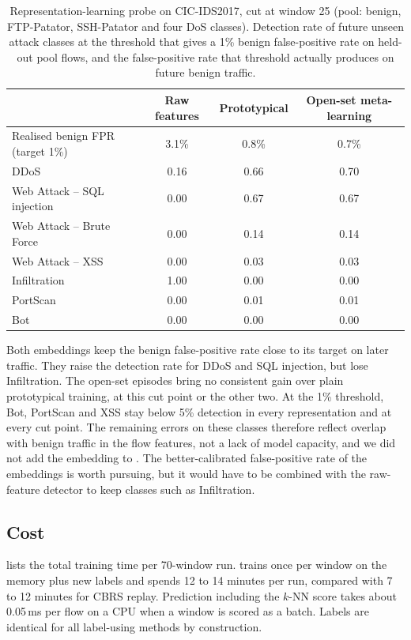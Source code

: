 \begin{table}[t]
\centering
\caption{Representation-learning probe on CIC-IDS2017, cut at window 25 (pool: benign, FTP-Patator, SSH-Patator
and four DoS classes). Detection rate of future unseen attack classes at the threshold that gives a 1\% benign
false-positive rate on held-out pool flows, and the false-positive rate that threshold actually produces on
future benign traffic.}
\label{tab:meta}
\small
\begin{tabular}{@{}lccc@{}}
\toprule
 & Raw features & Prototypical & Open-set meta-learning \\
\midrule
Realised benign FPR (target 1\%) & 3.1\% & 0.8\% & 0.7\% \\
\midrule
DDoS & 0.16 & 0.66 & 0.70 \\
Web Attack -- SQL injection & 0.00 & 0.67 & 0.67 \\
Web Attack -- Brute Force & 0.00 & 0.14 & 0.14 \\
Web Attack -- XSS & 0.00 & 0.03 & 0.03 \\
Infiltration & 1.00 & 0.00 & 0.00 \\
PortScan & 0.00 & 0.01 & 0.01 \\
Bot & 0.00 & 0.00 & 0.00 \\
\bottomrule
\end{tabular}
\end{table}

Both embeddings keep the benign false-positive rate close to its target on later traffic. They raise the detection
rate for DDoS and SQL injection, but lose Infiltration. The open-set episodes bring no consistent gain over plain
prototypical training, at this cut point or the other two. At the 1\% threshold, Bot, PortScan and XSS stay below
5\% detection in every representation and at every cut point. The remaining errors on these classes therefore reflect overlap with benign
traffic in the flow features, not a lack of model capacity, and we did not add the embedding to \nova{}. The
better-calibrated false-positive rate of the embeddings is worth pursuing, but it would have to be combined with
the raw-feature detector to keep classes such as Infiltration.

\subsection{Cost}
\label{sec:res-cost}
 lists the total training time per 70-window run. \nova{} trains once per window on the memory plus
new labels and spends 12 to 14 minutes per run, compared with 7 to 12 minutes for CBRS replay. Prediction
including the $k$-NN score takes about 0.05\,ms per flow on a CPU when a window is scored as a batch. Labels are identical for all
label-using methods by construction.

